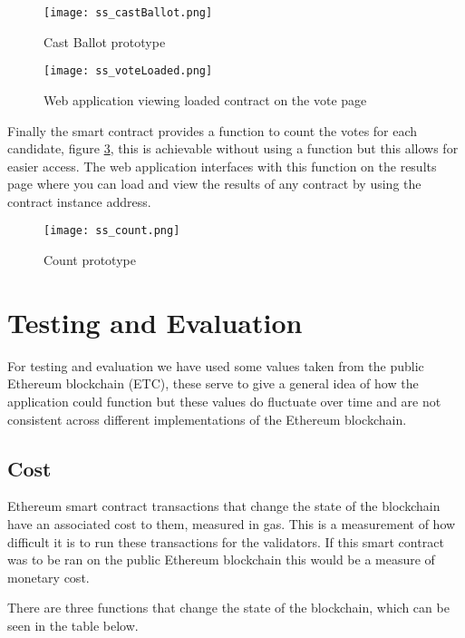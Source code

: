 \documentclass{entcs}
\begin{document}
\begin{figure}[h!]
    \centering
    \texttt{[image: ss\_castBallot.png]}
    \caption{Cast Ballot prototype}
    \label{fig:castBallot}
\end{figure}

\begin{figure}[h!]
    \centering
    \texttt{[image: ss\_voteLoaded.png]}
    \caption{Web application viewing loaded contract on the vote page}
    \label{fig:vote_loaded}
\end{figure}

Finally the smart contract provides a function to count the votes for each candidate, figure \ref{fig:count}, this is achievable without using a function but this allows for easier access. The web application interfaces with this function on the results page where you can load and view the results of any contract by using the contract instance address.


\begin{figure}[h!]
    \centering
    \texttt{[image: ss\_count.png]}
    \caption{Count prototype}
    \label{fig:count}
\end{figure}

\pagebreak
\section{Testing and Evaluation} \label{sec: t&e}
For testing and evaluation we have used some values taken from the public Ethereum blockchain (ETC), these serve to give a general idea of how the application could function but these values do fluctuate over time and are not consistent across different implementations of the Ethereum blockchain.

\subsection{Cost} \label{sec: cost}
Ethereum smart contract transactions that change the state of the blockchain have an associated cost to them, measured in gas. This is a measurement of how difficult it is to run these transactions for the validators. If this smart contract was to be ran on the public Ethereum blockchain this would be a measure of monetary cost. 

There are three functions that change the state of the blockchain, which can be seen in the table below.
\end{document}
